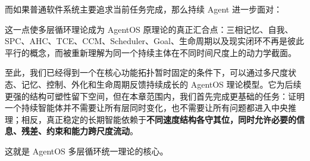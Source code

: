 而如果普通软件系统主要追求当前任务完成，那么持续 Agent 进一步面对：
\begin{statementbox}
\centering
{}
\end{statementbox}

这一点使多层循环理论成为 AgentOS 原理论的真正汇合点：三相记忆、自我、SPC、AHC、TCE、CCM、Scheduler、Goal、生命周期以及现实闭环不再是彼此平行的概念，而被重新理解为同一个持续主体在不同时间尺度上的动力学截面。

至此，我们已经得到一个在核心功能拓扑暂时固定的条件下，可以通过多尺度状态、记忆、控制、外化和生命周期反馈持续成长的 AgentOS 理论模型。它为后续更强的结构可塑性留下空间，但在本章范围内，我们首先完成更基础的任务：证明一个持续智能体并不需要让所有层同时变化，也不需要让所有问题都进入中央推理；相反，真正稳定的长期智能依赖于\textbf{不同速度结构各守其位，同时允许必要的信息、残差、约束和能力跨尺度流动}。

这就是 AgentOS 多层循环统一理论的核心。
